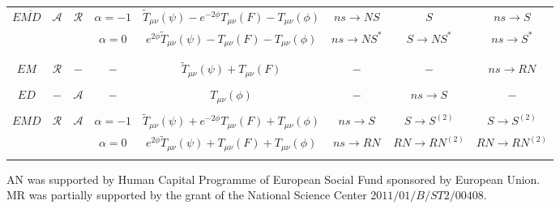 \documentclass[aps,showpacs,nofootinbib,floatfix]{revtex4}
\newcommand{\tT}{\tilde T}
\begin{document}
\begin{table}[t]
\begin{ruledtabular}
\begin{tabular}{c|c|c|c|c|c|c|c}
\multirow{2}{*}{$E\overline{MD}$} & \multirow{2}{*}{$\mathcal{A}$} & \multirow{2}{*}{$\mathcal{R}$} & $\alpha=-1$ & $\tT_{\mu\nu}\left(\psi\right)-e^{-2\phi}T_{\mu\nu}\left(F\right)-T_{\mu\nu}\left(\phi\right)$ & $ns\rightarrow NS$ & $S$ & $ns\rightarrow S$\\
& & & $\alpha=0$ & $e^{2\phi}\tT_{\mu\nu}\left(\psi\right)-T_{\mu\nu}\left(F\right)-T_{\mu\nu}\left(\phi\right)$ & $ns\rightarrow NS^\ast$ & $S\rightarrow NS^\ast$ & $ns\rightarrow S^\ast$\\
& & & & & & &\\

\hline
& & & & & & &\\

$EM$ \cite{ore03} & $\mathcal{R}$ & $-$ & $-$ & $\tT_{\mu\nu}\left(\psi\right)+T_{\mu\nu}\left(F\right)$ & $-$ & $-$ & $ns\rightarrow RN$\\
& & & & & & &\\

$ED$ \cite{ham96} & $-$ & $\mathcal{A}$ & $-$ & $T_{\mu\nu}\left(\phi\right)$ & $-$ & $ns\rightarrow S$ & $-$\\
& & & & & & &\\

\multirow{2}{*}{$EMD$ \cite{bor11}} & \multirow{2}{*}{$\mathcal{R}$} & \multirow{2}{*}{$\mathcal{A}$} & $\alpha=-1$ & $\tT_{\mu\nu}\left(\psi\right)+e^{-2\phi}T_{\mu\nu}\left(F\right)+T_{\mu\nu}\left(\phi\right)$ & $ns\rightarrow S$ & $S\rightarrow S^{\left(2\right)}$ & $S\rightarrow S^{\left(2\right)}$\\
& & & $\alpha=0$ & $e^{2\phi}\tT_{\mu\nu}\left(\psi\right)+T_{\mu\nu}\left(F\right)+T_{\mu\nu}\left(\phi\right)$ & $ns\rightarrow RN$ & $RN\rightarrow RN^{\left(2\right)}$ & $RN\rightarrow RN^{\left(2\right)}$\\
& & & & & & &\\

\end{tabular}
\end{ruledtabular}
\label{tab:summary}
\end{table}



\begin{acknowledgments}
AN was supported by Human Capital Programme of European Social Fund sponsored by European Union.\\                   
MR was partially supported by the grant of the National Science Center $2011/01/B/ST2/00408$.
\end{acknowledgments}
\end{document}
